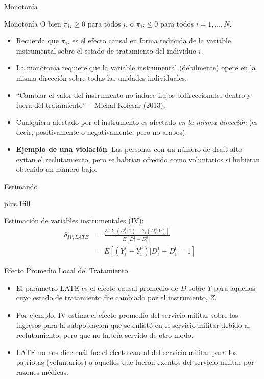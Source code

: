 \documentclass{beamer}
\begin{document}
\begin{frame}{Monotonía}
	
	\begin{block}{Monotonía}
	O bien $\pi_{1i}\geq{0}$ para todos $i$, o $\pi_{1i}\leq{0}$ para todos $i=1, \dots, N$.
	\end{block}

\begin{itemize}

\item Recuerda que $\pi_{1i}$ es el efecto causal en forma reducida de la variable instrumental sobre el estado de tratamiento del individuo $i$.  
\item La monotonía requiere que la variable instrumental (débilmente) opere en la misma dirección sobre todas las unidades individuales.  
\item ``Cambiar el valor del instrumento no induce flujos bidireccionales dentro y fuera del tratamiento'' -- Michal Kolesar (2013).
\item Cualquiera afectado por el instrumento es afectado \emph{en la misma dirección} (es decir, positivamente o negativamente, pero no ambos).
\item \textbf{Ejemplo de una violación}: Las personas con un número de draft alto evitan el reclutamiento, pero se habrían ofrecido como voluntarios si hubieran obtenido un número bajo.

\end{itemize}

\end{frame}


\begin{frame}{Estimando}

	\vskip3pt plus.1fill
				
	Estimación de variables instrumentales (IV): 
	\begin{align*}
	\delta_{IV,LATE} & = \frac{E[Y_i(D^1_i, 1) - Y_i(D^0_i, 0)]}{E[D^1_i - D^0_i]}& \\
	& = E[(Y^1_i - Y^0_i) | D^1_i - D^0_i = 1]
	\end{align*}

\end{frame}		

\begin{frame}{Efecto Promedio Local del Tratamiento}
	
	\begin{itemize}
	\item El parámetro LATE es el efecto causal promedio de $D$ sobre $Y$ para aquellos cuyo estado de tratamiento fue cambiado por el instrumento, $Z$.
	\item Por ejemplo, IV estima el efecto promedio del servicio militar sobre los ingresos para la subpoblación que se enlistó en el servicio militar debido al reclutamiento, pero que no habría servido de otro modo. 
	\item LATE no nos dice cuál fue el efecto causal del servicio militar para los patriotas (voluntarios) o aquellos que fueron exentos del servicio militar por razones médicas. 
	\end{itemize}
	
\end{frame}
\end{document}
